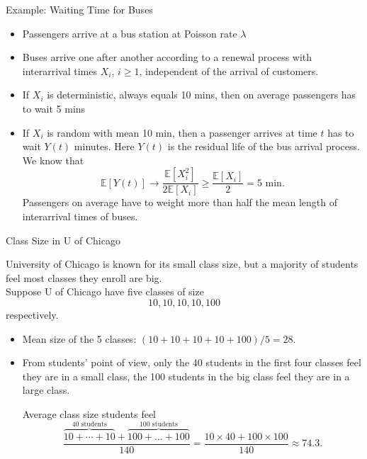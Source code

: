 \documentclass[letterpaper,handout, mathserif]{beamer}
\def\E{\mathbb E}
\begin{document}
\begin{frame}{Example: Waiting Time for Buses}
\begin{itemize}
\item Passengers arrive at a bus station at Poisson rate $\lambda$
\item Buses arrive one after another according to a renewal process with interarrival times $X_i$, $i\ge 1$,
independent of the arrival of customers.
\item If $X_i$ is deterministic, always equals 10 mins, then on average passengers has to wait 5 mins
\item If $X_i$ is random with mean 10 min, then a passenger arrives at time $t$ has to wait $Y(t)$ minutes. Here $Y(t)$ is the residual life of the bus arrival process.
We know that
$$
\E[Y(t)]\to\frac{\E[X_i^2]}{2\E[X_i]}\ge \frac{\E[X_i]}{2}=\mbox{5 min}.
$$
Passengers on average have to weight more than half the mean length of interarrival times of buses.
\end{itemize}
\end{frame}
\begin{frame}{Class Size in U of Chicago}

University of Chicago is known for its small class size,
but a majority of students feel most classes they enroll are big.\\

Suppose U of Chicago have five classes of size
\[
10, 10, 10, 10, 100
\]
respectively.
\begin{itemize}
\item Mean size of the 5 classes: $(10+10+10+10+100)/5=28.$
\item From students' point of view, only the 40 students in the first four classes feel they are in a small class, the 100 students in the big class feel they are in a large class.

Average class size students feel
\[
\frac{\overbrace{10+\cdots+10}^{40\text{ students}}+\overbrace{100+\ldots+100}^{100\text{ students}}}{140}
=\frac{10\times40+100\times100}{140}\approx74.3.
\]
\end{itemize}

\end{frame}
\end{document}
